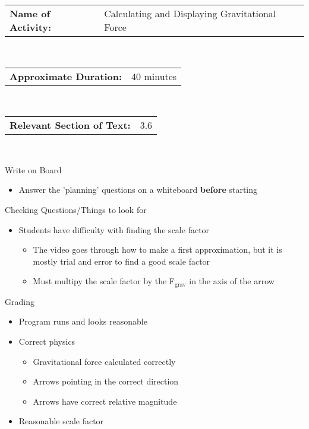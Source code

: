 \documentclass[11pt]{article}
\begin{document}
\begin{noindent}
\begin{flushleft}

\newcommand{\detail}[2]
{\begin{tabularx}{6.5in}{p{2in} X}
\textbf{#1:} & #2
\end{tabularx}
\vspace{11pt}}

\detail{Name of Activity}{Calculating and Displaying Gravitational Force}\\
\detail{Approximate Duration}{40 minutes}\\
\detail{Relevant Section of Text}{3.6}\\

\begin{description}
\item[ Write on Board] 
\end{description}

\begin{itemize}
\item Answer the 'planning' questions on a whiteboard \textbf{before} starting
\end{itemize}

\begin{description}
\item[Checking Questions/Things to look for] 
\end{description}

\begin{itemize}
\item Students have difficulty with finding the scale factor
\begin{itemize}
\item The video goes through how to make a first approximation, but it is mostly trial and error to find a good scale factor
\item Must multipy the scale factor by the F$_{\text{grav}}$ in the axis of the arrow
\end{itemize}
\end{itemize}

\begin{description}
\item[Grading] 
\end{description}

\begin{itemize}
\item Program runs and looks reasonable
\item Correct physics
\begin{itemize}
\item Gravitational force calculated correctly
\item Arrows pointing in the correct direction
\item Arrows have correct relative magnitude
\end{itemize}
\item Reasonable scale factor
\end{itemize}


\end{flushleft}
\end{noindent}
\end{document}
